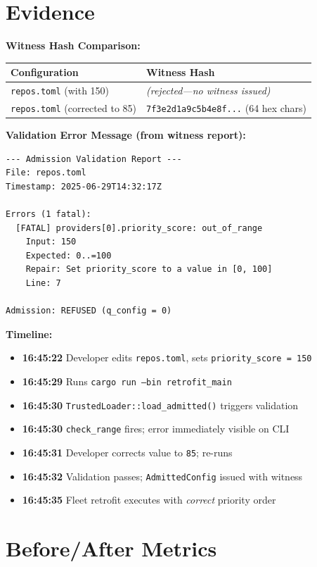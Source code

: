\documentclass[11pt,a4paper]{article}
\begin{document}
\section*{Evidence}

\textbf{Witness Hash Comparison:}

\begin{tabular}{ll}
\toprule
\textbf{Configuration} & \textbf{Witness Hash} \\
\midrule
\texttt{repos.toml} (with 150) & \textit{(rejected—no witness issued)} \\
\texttt{repos.toml} (corrected to 85) & \texttt{7f3e2d1a9c5b4e8f...} (64 hex chars) \\
\bottomrule
\end{tabular}

\textbf{Validation Error Message (from witness report):}

\begin{Verbatim}[fontsize=\small]
--- Admission Validation Report ---
File: repos.toml
Timestamp: 2025-06-29T14:32:17Z

Errors (1 fatal):
  [FATAL] providers[0].priority_score: out_of_range
    Input: 150
    Expected: 0..=100
    Repair: Set priority_score to a value in [0, 100]
    Line: 7

Admission: REFUSED (q_config = 0)
\end{Verbatim}

\textbf{Timeline:}
\begin{itemize}
  \item \textbf{16:45:22} Developer edits \texttt{repos.toml}, sets \texttt{priority\_score = 150}
  \item \textbf{16:45:29} Runs \texttt{cargo run --bin retrofit\_main}
  \item \textbf{16:45:30} \texttt{TrustedLoader::load\_admitted()} triggers validation
  \item \textbf{16:45:30} \texttt{check\_range} fires; error immediately visible on CLI
  \item \textbf{16:45:31} Developer corrects value to \texttt{85}; re-runs
  \item \textbf{16:45:32} Validation passes; \texttt{AdmittedConfig} issued with witness
  \item \textbf{16:45:35} Fleet retrofit executes with \emph{correct} priority order
\end{itemize}

\section*{Before/After Metrics}
\end{document}
